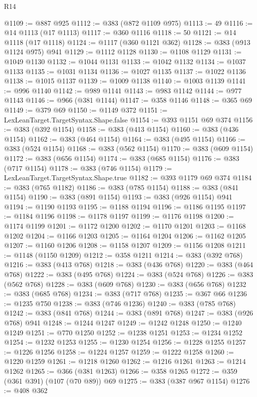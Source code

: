 \begin{lexlean}{R14}
\begin{coremodule}
@1109 := @887 @925
@1112 := @383 (@872 @1109 @975)
@1113 := 49
@1116 := @14 @1113 (@17 @1113)
@1117 := @360 @1116
@1118 := 50
@1121 := @14 @1118 (@17 @1118)
@1124 := @1117 (@360 @1121 @362)
@1128 := @383 (@913 @1124 @975) @941
@1129 := @1112 @1128
@1130 := @1108 @1129
@1131 := @1049 @1130
@1132 := @1044 @1131
@1133 := @1042 @1132
@1134 := @1037 @1133
@1135 := @1031 @1134
@1136 := @1027 @1135
@1137 := @1022 @1136
@1138 := @1015 @1137
@1139 := @1009 @1138
@1140 := @1003 @1139
@1141 := @996 @1140
@1142 := @989 @1141
@1143 := @983 @1142
@1144 := @977 @1143
@1146 := @966 (@381 @1144)
@1147 := @358 @1146
@1148 := @365 @69
@1149 := @379 @69
@1150 := @1149 @372
@1151 := LexLeanTarget.TargetSyntax.Shape.false
@1154 := @393 @1151 @69 @374
@1156 := @383 (@392 @1154)
@1158 := @383 (@413 @1154)
@1160 := @383 (@436 @1154)
@1162 := @383 (@464 @1154)
@1164 := @383 (@495 @1154)
@1166 := @383 (@524 @1154)
@1168 := @383 (@562 @1154)
@1170 := @383 (@609 @1154)
@1172 := @383 (@656 @1154)
@1174 := @383 (@685 @1154)
@1176 := @383 (@717 @1154)
@1178 := @383 (@746 @1154)
@1179 := LexLeanTarget.TargetSyntax.Shape.true
@1182 := @393 @1179 @69 @374
@1184 := @383 (@765 @1182)
@1186 := @383 (@785 @1154)
@1188 := @383 (@841 @1154)
@1190 := @383 (@891 @1154)
@1193 := @383 (@926 @1154) @941
@1194 := @1190 @1193
@1195 := @1188 @1194
@1196 := @1186 @1195
@1197 := @1184 @1196
@1198 := @1178 @1197
@1199 := @1176 @1198
@1200 := @1174 @1199
@1201 := @1172 @1200
@1202 := @1170 @1201
@1203 := @1168 @1202
@1204 := @1166 @1203
@1205 := @1164 @1204
@1206 := @1162 @1205
@1207 := @1160 @1206
@1208 := @1158 @1207
@1209 := @1156 @1208
@1211 := @1148 (@1150 @1209)
@1212 := @358 @1211
@1214 := @383 (@392 @768)
@1216 := @383 (@413 @768)
@1218 := @383 (@436 @768)
@1220 := @383 (@464 @768)
@1222 := @383 (@495 @768)
@1224 := @383 (@524 @768)
@1226 := @383 (@562 @768)
@1228 := @383 (@609 @768)
@1230 := @383 (@656 @768)
@1232 := @383 (@685 @768)
@1234 := @383 (@717 @768)
@1235 := @367 @66
@1236 := @1235 @750
@1238 := @383 (@746 @1236)
@1240 := @383 (@785 @768)
@1242 := @383 (@841 @768)
@1244 := @383 (@891 @768)
@1247 := @383 (@926 @768) @941
@1248 := @1244 @1247
@1249 := @1242 @1248
@1250 := @1240 @1249
@1251 := @770 @1250
@1252 := @1238 @1251
@1253 := @1234 @1252
@1254 := @1232 @1253
@1255 := @1230 @1254
@1256 := @1228 @1255
@1257 := @1226 @1256
@1258 := @1224 @1257
@1259 := @1222 @1258
@1260 := @1220 @1259
@1261 := @1218 @1260
@1262 := @1216 @1261
@1263 := @1214 @1262
@1265 := @366 (@381 @1263)
@1266 := @358 @1265
@1272 := @359 (@361 @391) (@107 (@70 @89)) @69
@1275 := @383 (@387 @967 @1154)
@1276 := @408 @362

\end{coremodule}
\end{lexlean}
